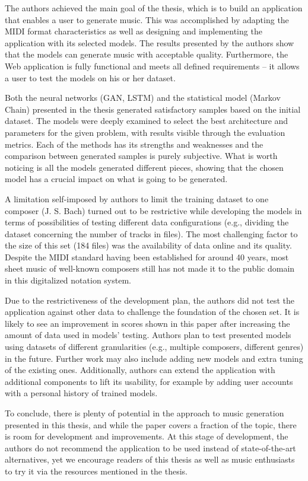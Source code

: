 \documentclass[a4paper, 11pt, twoside]{report}
\theoremstyle{definition}
\begin{document}
The authors achieved the main goal of the thesis, which is to build an application that enables a user to generate music. This was accomplished by adapting the MIDI format characteristics as well as designing and implementing the application with its selected models. The results presented by the authors show that the models can generate music with acceptable quality. Furthermore, the Web application is fully functional and meets all defined requirements -- it allows a user to test the models on his or her dataset. \par
Both the neural networks (GAN, LSTM) and the statistical model (Markov Chain) presented in the thesis generated satisfactory samples based on the initial dataset. The models were deeply examined to select the best architecture and parameters for the given problem, with results visible through the evaluation metrics. Each of the methods has its strengths and weaknesses and the comparison between generated samples is purely subjective. What is worth noticing is all the models generated different pieces, showing that the chosen model has a crucial impact on what is going to be generated. \par
A limitation self-imposed by authors to limit the training dataset to one composer (J. S. Bach) turned out to be restrictive while developing the models in terms of possibilities of testing different data configurations (e.g., dividing the dataset concerning the number of tracks in files). The most challenging factor to the size of this set (184 files) was the availability of data online and its quality. Despite the MIDI standard having been established for around 40 years, most sheet music of well-known composers still has not made it to the public domain in this digitalized notation system. \par
Due to the restrictiveness of the development plan, the authors did not test the application against other data to challenge the foundation of the chosen set. It is likely to see an improvement in scores shown in this paper after increasing the amount of data used in models' testing. Authors plan to test presented models using datasets of different granularities (e.g., multiple composers, different genres) in the future. Further work may also include adding new models and extra tuning of the existing ones. Additionally, authors can extend the application with additional components to lift its usability, for example by adding user accounts with a personal history of trained models. \par
To conclude, there is plenty of potential in the approach to music generation presented in this thesis, and while the paper covers a fraction of the topic, there is room for development and improvements. At this stage of development, the authors do not recommend the application to be used instead of state-of-the-art alternatives, yet we encourage readers of this thesis as well as music enthusiasts to try it via the resources mentioned in the thesis. \par
\end{document}
